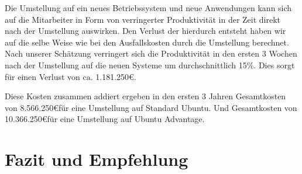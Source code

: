 \documentclass[12pt,utf8]{scrartcl}
\begin{document}
Die Umstellung auf ein neues Betriebssystem und neue Anwendungen kann sich auf die Mitarbeiter in Form von verringerter Produktivität in der Zeit direkt nach der Umstellung auswirken. Den Verlust der hierdurch entsteht haben wir auf die selbe Weise wie bei den Ausfallskosten durch die Umstellung berechnet. Nach unserer Schätzung verringert sich die Produktivität in den ersten 3 Wochen nach der Umstellung auf die neuen Systeme um durchschnittlich 15\%. Dies sorgt für einen Verlust von ca. 1.181.250\euro .
\newline

Diese Kosten zusammen addiert ergeben in den ersten 3 Jahren Gesamtkosten von 8.566.250\euro \space für eine Umstellung auf Standard Ubuntu. Und Gesamtkosten von 10.366.250\euro \space für eine Umstellung auf Ubuntu Advantage.
\newpage
\section*{Fazit und Empfehlung}

\newpage
{}

\end{document}
